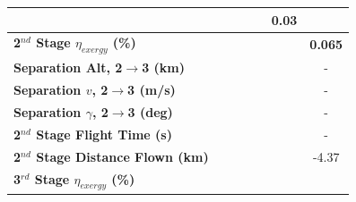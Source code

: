 \begin{table}[ht]
\begin{tabular}{l c c c c c c}
		& \firstsecondSeparationgammamThreeNinetyFiveNoReturn
		& \firstsecondSeparationgammamThreeStandardNoReturn
		& \firstsecondSeparationgammamThreeOneHundredFiveNoReturn
		& \firstsecondSeparationgammamThreeOneHundredTenNoReturn
		&0.03
		\\
		\hline 
		\textbf{2$^{nd}$ Stage $\eta_{exergy}$ (\%)}
		& \textbf{\secondExergyEffmThreeNinetyNoReturn}
		& \textbf{\secondExergyEffmThreeNinetyFiveNoReturn}
		& \textbf{\secondExergyEffmThreeStandardNoReturn}
		& \textbf{\secondExergyEffmThreeOneHundredFiveNoReturn}
		& \textbf{\secondExergyEffmThreeOneHundredTenNoReturn}
		& \textbf{0.065}
		\\
		\textbf{Separation Alt, 2$\rightarrow$3 (km)}
		& \secondthirdSeparationAltmThreeNinetyNoReturn
		& \secondthirdSeparationAltmThreeNinetyFiveNoReturn
		& \secondthirdSeparationAltmThreeStandardNoReturn
		& \secondthirdSeparationAltmThreeOneHundredFiveNoReturn
		& \secondthirdSeparationAltmThreeOneHundredTenNoReturn
		& -
		\\
		\textbf{Separation $v$, 2$\rightarrow$3 (m/s)}
		& \secondthirdSeparationvmThreeNinetyNoReturn
		& \secondthirdSeparationvmThreeNinetyFiveNoReturn
		& \secondthirdSeparationvmThreeStandardNoReturn
		& \secondthirdSeparationvmThreeOneHundredFiveNoReturn
		& \secondthirdSeparationvmThreeOneHundredTenNoReturn
		& -
		\\
		\textbf{Separation $\gamma$, 2$\rightarrow$3 (deg)}
		& \secondthirdSeparationgammamThreeNinetyNoReturn
		& \secondthirdSeparationgammamThreeNinetyFiveNoReturn
		& \secondthirdSeparationgammamThreeStandardNoReturn
		& \secondthirdSeparationgammamThreeOneHundredFiveNoReturn
		& \secondthirdSeparationgammamThreeOneHundredTenNoReturn
		& -
		\\
		\textbf{2$^{nd}$ Stage Flight Time (s)}
		& \secondFlightTimemThreeNinetyNoReturn
		& \secondFlightTimemThreeNinetyFiveNoReturn
		& \secondFlightTimemThreeStandardNoReturn
		& \secondFlightTimemThreeOneHundredFiveNoReturn
		& \secondFlightTimemThreeOneHundredTenNoReturn
		& -
		\\
		\textbf{2$^{nd}$ Stage Distance Flown (km)}
		& \SecondDistmThreeNinetyNoReturn
		& \SecondDistmThreeNinetyFiveNoReturn
		& \SecondDistmThreeStandardNoReturn
		& \SecondDistmThreeOneHundredFiveNoReturn
		& \SecondDistmThreeOneHundredTenNoReturn
		&-4.37
		\\
		\hline 
		\textbf{3$^{rd}$ Stage $\eta_{exergy}$ (\%)}
		& \textbf{\thirddExergyEffmThreeNinetyNoReturn}
		& \textbf{\thirddExergyEffmThreeNinetyFiveNoReturn}
		& \textbf{\thirddExergyEffmThreeStandardNoReturn}

\end{tabular}
\end{table}
